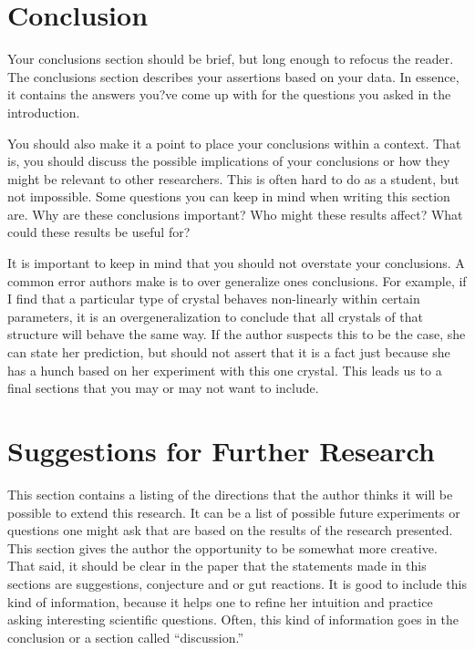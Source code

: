 \documentclass[preprint,pre,floats,aps,amsmath,amssymb]{revtex4}
\begin{document}
\section{Conclusion}
\label{sec:conclusion}

Your conclusions section should be brief, but long enough to refocus
the reader.  The conclusions section describes your assertions based
on your data.  In essence, it contains the answers you?ve come up with
for the questions you asked in the introduction.  

You should also make it a point to place your conclusions within a
context.  That is, you should discuss the possible implications of
your conclusions or how they might be relevant to other researchers. 
This is often hard to do as a student, but not impossible. Some
questions you can keep in mind when  writing this section are.  Why
are these conclusions important?  Who might these results affect? 
What could these results be useful for? 

It is important to keep in mind that you should not overstate your
conclusions.  A common error authors make is to over generalize ones
conclusions.  For example, if I find that a particular type of crystal
behaves non-linearly within certain parameters, it is an
overgeneralization to conclude that all crystals of that structure
will behave the same way.  If the author suspects this to be the case,
she can state her prediction, but should not assert that it is a fact
just because she has a hunch based on her experiment with this one
crystal.  This leads us to a final sections that you may or may not
want to include.

\section{Suggestions for Further Research}
\label{sec:further_research}

This section contains a listing of the directions that the author
thinks it will be possible to extend this research.  It can be a list
of possible future experiments or questions one might ask that are
based on the results of the research presented.  This section gives
the author the opportunity to be somewhat more creative.  That said,
it should be clear in the paper that the statements made in this
sections are suggestions, conjecture and or gut reactions.  It is good
to include this kind of information, because it helps one to refine
her intuition and practice asking interesting scientific questions. 
Often, this kind of information goes in the conclusion or a section
called ``discussion.''
\end{document}
